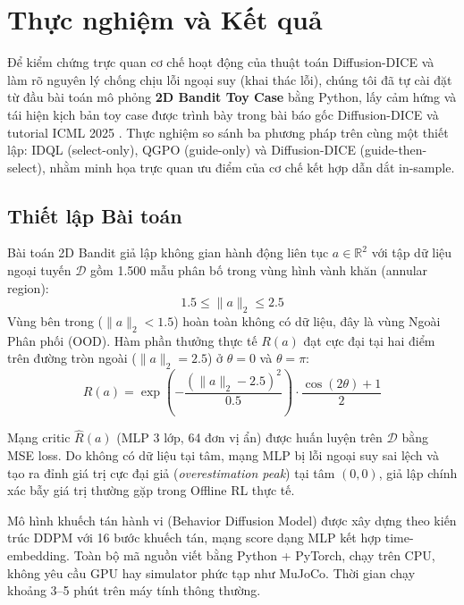 
\section{Thực nghiệm và Kết quả}

Để kiểm chứng trực quan cơ chế hoạt động của thuật toán Diffusion-DICE và làm rõ
nguyên lý chống chịu lỗi ngoại suy (khai thác lỗi), chúng tôi đã tự cài đặt
từ đầu bài toán mô phỏng \textbf{2D Bandit Toy Case} bằng Python, lấy cảm hứng
và tái hiện kịch bản toy case được trình bày trong bài báo gốc Diffusion-DICE
\cite{mao2024diffusiondice} và tutorial ICML 2025 \cite{eysenbach2025generativerl}.
Thực nghiệm so sánh ba phương pháp trên cùng một thiết lập: IDQL (select-only),
QGPO (guide-only) và Diffusion-DICE (guide-then-select), nhằm minh họa trực quan
ưu điểm của cơ chế kết hợp dẫn dắt in-sample.

\subsection{Thiết lập Bài toán}

Bài toán 2D Bandit giả lập không gian hành động liên tục $a \in \mathbb{R}^2$ với
tập dữ liệu ngoại tuyến $\mathcal{D}$ gồm 1.500 mẫu phân bố trong vùng hình
vành khăn (annular region):
\[
    1.5 \leq \|a\|_2 \leq 2.5
\]
Vùng bên trong ($\|a\|_2 < 1.5$) hoàn toàn không có dữ liệu, đây là vùng
Ngoài Phân phối (OOD). Hàm phần thưởng thực tế $R(a)$ đạt cực đại tại hai
điểm trên đường tròn ngoài ($\|a\|_2 = 2.5$) ở $\theta = 0$ và $\theta = \pi$:
\[
    R(a) = \exp\!\left(-\frac{(\|a\|_2 - 2.5)^2}{0.5}\right)
           \cdot \frac{\cos(2\theta) + 1}{2}
\]

Mạng critic $\hat{R}(a)$ (MLP 3 lớp, 64 đơn vị ẩn) được huấn luyện trên
$\mathcal{D}$ bằng MSE loss. Do không có dữ liệu tại tâm, mạng MLP bị lỗi ngoại
suy sai lệch và tạo ra đỉnh giá trị cực đại giả (\textit{overestimation peak})
tại tâm $(0,0)$, giả lập chính xác bẫy giá trị thường gặp trong Offline RL
thực tế.

Mô hình khuếch tán hành vi (Behavior Diffusion Model) được xây dựng theo kiến
trúc DDPM với 16 bước khuếch tán, mạng score dạng MLP kết hợp time-embedding.
Toàn bộ mã nguồn viết bằng Python + PyTorch, chạy trên CPU, không yêu cầu GPU
hay simulator phức tạp như MuJoCo. Thời gian chạy khoảng 3--5 phút trên máy
tính thông thường.

